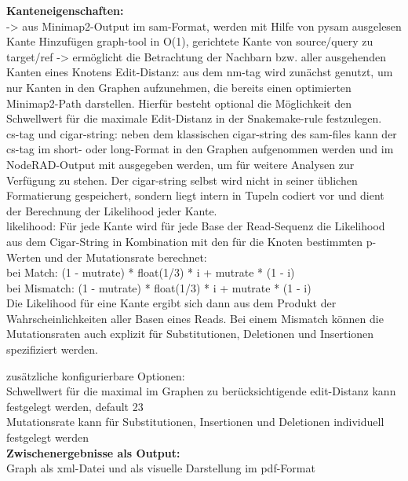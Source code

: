 \noindent\textbf{Kanteneigenschaften:} \\ 
    -> aus Minimap2-Output im sam-Format, werden mit Hilfe von pysam ausgelesen\\
    Kante Hinzufügen graph-tool in O(1), gerichtete Kante von source/query zu target/ref -> ermöglicht die Betrachtung der Nachbarn bzw. aller ausgehenden Kanten eines Knotens
    Edit-Distanz: aus dem nm-tag wird zunächst genutzt, um nur Kanten in den Graphen aufzunehmen, die bereits einen optimierten Minimap2-Path darstellen. Hierfür besteht optional die Möglichkeit den Schwellwert für die maximale Edit-Distanz in der Snakemake-rule festzulegen.\\
        
    cs-tag und cigar-string: neben dem klassischen cigar-string des sam-files kann der cs-tag im short- oder long-Format in den Graphen aufgenommen werden und im NodeRAD-Output mit ausgegeben werden, um für weitere Analysen zur Verfügung zu stehen. Der cigar-string selbst wird nicht in seiner üblichen Formatierung gespeichert, sondern liegt intern in Tupeln codiert vor und dient der Berechnung der Likelihood jeder Kante.\\
    
    likelihood: Für jede Kante wird für jede Base der Read-Sequenz die Likelihood aus dem Cigar-String in Kombination mit den für die Knoten bestimmten p-Werten und der Mutationsrate berechnet:\\    
    bei Match: (1 - mutrate) * float(1/3) * i + mutrate * (1 - i)\\    
    bei Mismatch: (1 - mutrate) * float(1/3) * i + mutrate * (1 - i)\\    
    Die Likelihood für eine Kante ergibt sich dann aus dem Produkt der Wahrscheinlichkeiten aller Basen eines Reads. Bei einem Mismatch können die Mutationsraten auch explizit für Substitutionen, Deletionen und Insertionen spezifiziert werden.
    
zusätzliche konfigurierbare Optionen: \\
    Schwellwert für die maximal im Graphen zu berücksichtigende edit-Distanz kann festgelegt werden, default 23 \\
    Mutationsrate kann für Substitutionen, Insertionen und Deletionen individuell festgelegt werden \\
\textbf{Zwischenergebnisse als Output:} \\
    Graph als xml-Datei und als visuelle Darstellung im pdf-Format \\
    
